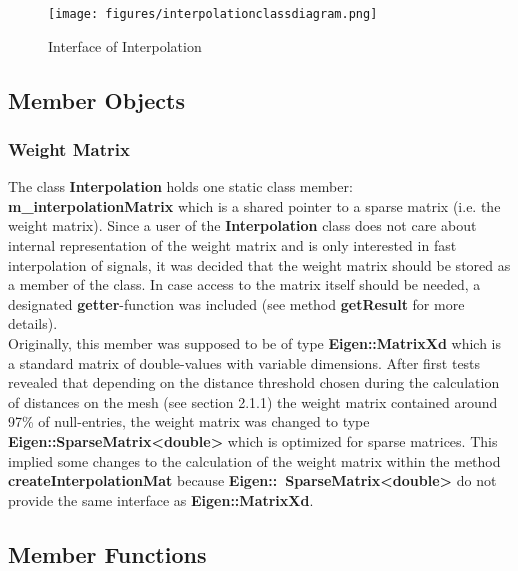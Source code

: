 \begin{figure}[h]
	\begin{center}
		\texttt{[image: figures/interpolationclassdiagram.png]}
		\caption{Interface of Interpolation}
	\end{center}
\end{figure}

\subsection{Member Objects}

\subsubsection{Weight Matrix}
The class \textbf{Interpolation} holds one static class member: \textbf{m\_interpolationMatrix} which is a shared pointer to a sparse matrix (i.e. the weight matrix). Since a user of the \textbf{Interpolation} class does not care about internal representation of the weight matrix and is only interested in fast interpolation of signals, it was decided that the weight matrix should be stored as a member of the class. In case access to the matrix itself should be needed, a designated \textbf{getter}-function was included (see method \textbf{getResult} for more details).\\
Originally, this member was supposed to be of type \textbf{Eigen::MatrixXd} which is a standard matrix of double-values with variable dimensions. After first tests revealed that depending on the distance threshold chosen during the calculation of distances on the mesh (see section 2.1.1) the weight matrix contained around 97\% of null-entries, the weight matrix was changed to type \textbf{Eigen::SparseMatrix<double>} which is optimized for sparse matrices. This implied some changes to the calculation of the weight matrix within the method \textbf{createInterpolationMat} because \textbf{Eigen::\ SparseMatrix<double>} do not provide the same interface as \textbf{Eigen::MatrixXd}.

\subsection{Member Functions}

